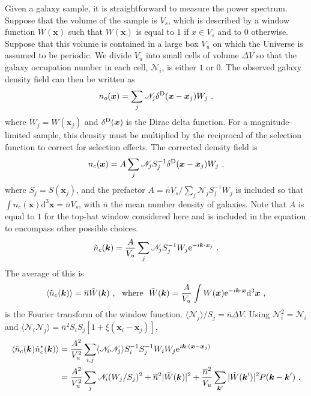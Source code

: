 \documentclass[12pt,a4paper]{article}
\renewcommand{\vec}[1]{\boldsymbol{#1}}
\newcommand{\dif}{\mathrm{d}}
\begin{document}
Given a galaxy sample, it is straightforward to measure the power spectrum. Suppose that the volume of the sample is $V_s$, which is described by a window function $W(\vec{x})$ such that $W(\vec{x})$ is equal to $1$ if $x \in V_s$ and to $0$ otherwise. Suppose that this volume is contained in a large box $V_u$ on which the Universe is assumed to be periodic. We divide $V_u$ into small cells of volume $\Delta V$ so that the galaxy occupation number in each cell, $\mathscr N_i$, is either $1$ or $0$. The observed galaxy density field can then be written as
\begin{equation}
n_o(\vec{x}) = \sum_j \mathscr N_j \delta^{\rm D} (\vec{x} -\vec{x}_j) W_j ~,
\end{equation}
where $W_j = W(\vec{x}_j)$ and $\delta^{\rm D}(\vec{x})$ is the Dirac delta function. For a magnitude-limited sample, this density must be multiplied by the reciprocal of the selection function to correct for selection effects. The corrected density field is
\begin{equation}
n_c(\vec{x}) = A \sum_j \mathscr N_j S_j^{-1} \delta^{\rm D} (\vec{x} -\vec{x}_j) W_j ~,
\end{equation}
where $S_j = S(\vec{x}_j)$, and the prefactor $A = \overline{n}V_s/\sum_j \mathscr N_j S_j^{-1} W_j$ is included so that $\int n_c(\vec{x}) \dif^3 \vec{x} =  \overline{n}V_s$, with $\overline{n}$ the mean number density of galaxies. Note that $A$ is equal to $1$ for the top-hat window considered here and is included in the equation to encompass other possible choices. 
\begin{equation}
\tilde{n}_c(\vec{k}) = \dfrac{A}{V_u} \sum_j \mathscr N_j S_j^{-1}  W_j {\rm e}^{-i \vec{k} \cdot \vec{x}_j} ~.
\end{equation}
The average of this is
\begin{equation}
\langle \tilde{n}_c(\vec{k}) \rangle = \overline{n} \tilde{W}(\vec{k}) ~, ~~ \text{where} ~~ \tilde{W}(\vec{k}) = \dfrac{A}{V_u} \int W(\vec{x}) {\rm e}^{-i\vec{k} \cdot \vec{x}} \dif^3 \vec{x} ~,
\end{equation}
is the Fourier transform of the window function. $\langle \mathscr N_j \rangle/S_j = \overline{n} \Delta V$. Using $\mathscr N_i^2 = \mathscr N_i$ and $\langle \mathscr N_i \mathscr N_j \rangle = \overline{n}^2 S_i S_j [1+\xi(\vec{x}_i -\vec{x}_j)]$, 
\begin{align}
\nonumber \langle \tilde{n}_c(\vec{k}) \tilde{n}_c^\ast (\vec{k}) \rangle &= \dfrac{A^2}{V_u^2} \sum_{i,j} \langle \mathscr N_i \mathscr N_j \rangle S_i^{-1} S_j^{-1} W_i W_j {\rm e}^{i \vec{k}\cdot (\vec{x} -\vec{x}_j)} \\
&= \dfrac{A^2}{V_u^2}  \sum_{j} \mathscr N_i (W_j /S_j)^2 +\overline{n}^2 |\tilde{W}(\vec{k})|^2 + \dfrac{\overline{n}^2}{V_u} \sum_{\vec{k}^\prime} |\tilde{W}(\vec{k}^\prime)|^2 P(\vec{k} -\vec{k}^\prime) ~,
\end{align}
\end{document}
